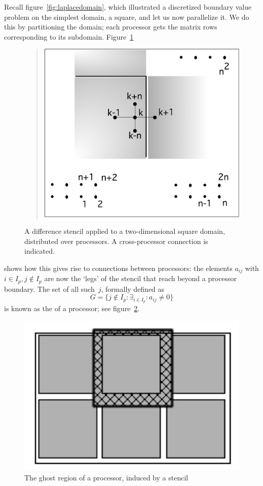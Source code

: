 Recall figure~\ref{fig:laplacedomain}, which illustrated a discretized
boundary value problem on the simplest domain, a square, and let us
now parallelize it. We do this by partitioning the domain; each
processor gets the matrix rows corresponding to its subdomain.
Figure~\ref{fig:laplaceparallel}
\begin{figure}
  \begin{quote}
    \includegraphics[scale=.12]{graphics-public/laplaceparallel}
  \end{quote}
  \caption{A difference stencil applied to a two-dimensional square
    domain, distributed over processors. A cross-processor connection
    is indicated.}
  \label{fig:laplaceparallel}
\end{figure}
shows how this gives rise to connections between processors: the
elements $a_{ij}$ with $i\in I_p,j\not\in I_p$ are now the `legs' of
the stencil that reach beyond a processor boundary. The set of all
such~$j$, formally defined as 
\[ G = \{ j\not\in I_p \colon 
    \exists_{i\in I_p}\colon a_{ij}\not=0 \}
\]
is known as the  of a processor; see
figure~\ref{fig:ghost}.
\begin{figure}
  \includegraphics[scale=.25]{graphics-public/ghostpdf}
  \caption{The ghost region of a processor, induced by a stencil}
  \label{fig:ghost}
\end{figure}

